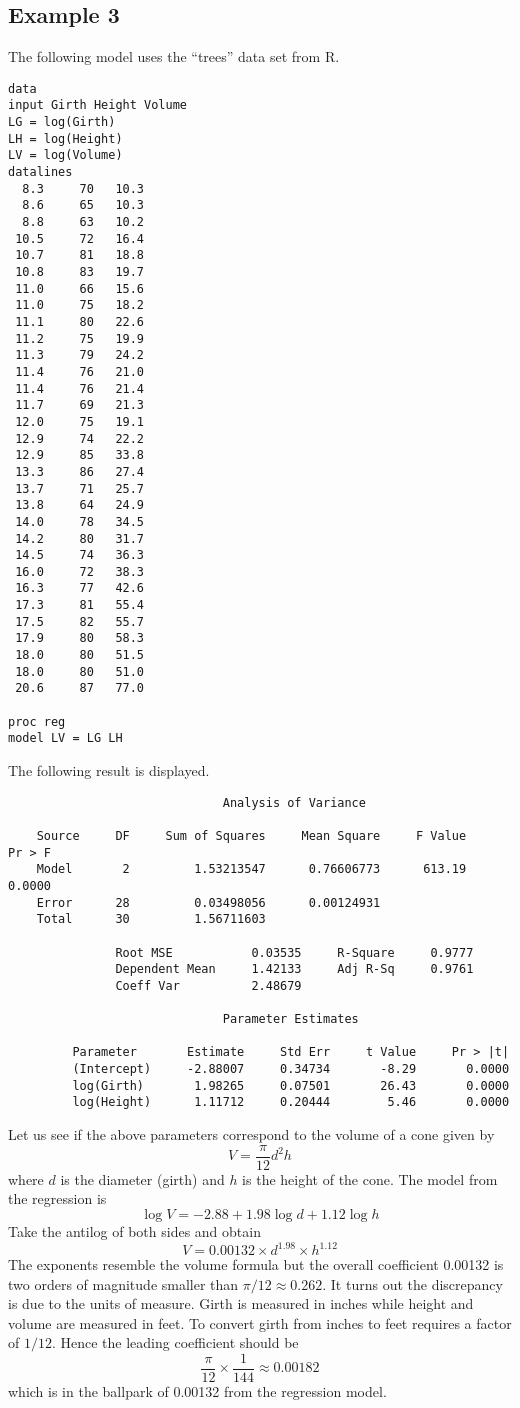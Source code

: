\documentclass[11pt]{article}
\begin{document}
\subsection*{Example 3}
The following model uses the ``trees'' data set from R.

\begin{Verbatim}
data
input Girth Height Volume
LG = log(Girth)
LH = log(Height)
LV = log(Volume)
datalines
  8.3     70   10.3
  8.6     65   10.3
  8.8     63   10.2
 10.5     72   16.4
 10.7     81   18.8
 10.8     83   19.7
 11.0     66   15.6
 11.0     75   18.2
 11.1     80   22.6
 11.2     75   19.9
 11.3     79   24.2
 11.4     76   21.0
 11.4     76   21.4
 11.7     69   21.3
 12.0     75   19.1
 12.9     74   22.2
 12.9     85   33.8
 13.3     86   27.4
 13.7     71   25.7
 13.8     64   24.9
 14.0     78   34.5
 14.2     80   31.7
 14.5     74   36.3
 16.0     72   38.3
 16.3     77   42.6
 17.3     81   55.4
 17.5     82   55.7
 17.9     80   58.3
 18.0     80   51.5
 18.0     80   51.0
 20.6     87   77.0

proc reg
model LV = LG LH
\end{Verbatim}

The following result is displayed.

\begin{Verbatim}
                              Analysis of Variance

    Source     DF     Sum of Squares     Mean Square     F Value     Pr > F
    Model       2         1.53213547      0.76606773      613.19     0.0000
    Error      28         0.03498056      0.00124931                       
    Total      30         1.56711603                                       

               Root MSE           0.03535     R-Square     0.9777
               Dependent Mean     1.42133     Adj R-Sq     0.9761
               Coeff Var          2.48679                        

                              Parameter Estimates

         Parameter       Estimate     Std Err     t Value     Pr > |t|
         (Intercept)     -2.88007     0.34734       -8.29       0.0000
         log(Girth)       1.98265     0.07501       26.43       0.0000
         log(Height)      1.11712     0.20444        5.46       0.0000
\end{Verbatim}

Let us see if the above parameters correspond to the volume of a cone
given by
$$
V=\frac{\pi}{12}d^2h
$$
where $d$ is the diameter (girth) and $h$ is the height of the cone.
The model from the regression is
$$
\log V=-2.88+1.98\log d+1.12\log h
$$
Take the antilog of both sides and obtain
$$
V=0.00132\times d^{1.98}\times h^{1.12}
$$
The exponents resemble the volume formula but the overall coefficient 0.00132
is two orders of magnitude smaller than $\pi/12\approx0.262$.
It turns out the discrepancy is due to the units of measure.
Girth is measured in inches while height and volume are measured in feet.
To convert girth from inches to feet requires a factor of $1/12$.
Hence the leading coefficient should be
$$
\frac{\pi}{12}\times\frac{1}{144}\approx0.00182
$$
which is in the ballpark of 0.00132 from the regression model.
\end{document}
